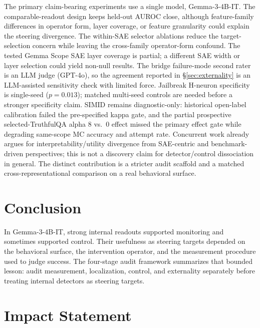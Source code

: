 \documentclass{article}
\begin{document}
The primary claim-bearing experiments use a single model, Gemma-3-4B-IT.
The comparable-readout design keeps held-out AUROC close, although feature-family differences in operator form, layer coverage, or feature granularity could explain the steering divergence.
The within-SAE selector ablations reduce the target-selection concern while leaving the cross-family operator-form confound.
The tested Gemma Scope SAE layer coverage \citep{lieberum2024gemmascope} is partial; a different SAE width or layer selection could yield non-null results.
The bridge failure-mode second rater is an LLM judge (GPT-4o), so the agreement reported in \S\ref{sec:externality} is an LLM-assisted sensitivity check with limited force.
Jailbreak H-neuron specificity is single-seed ($p = 0.013$); matched multi-seed controls are needed before a stronger specificity claim.
SIMID remains diagnostic-only: historical open-label calibration failed the pre-specified kappa gate, and the partial prospective selected-TruthfulQA alpha 8 vs.\ 0 effect missed the primary effect gate while degrading same-scope MC accuracy and attempt rate.
Concurrent work \citep{wang2026interpretability,arad2025saes,wu2025axbench} already argues for interpretability/utility divergence from SAE-centric and benchmark-driven perspectives; this is not a discovery claim for detector/control dissociation in general.
The distinct contribution is a stricter audit scaffold and a matched cross-representational comparison on a real behavioral surface.

\section{Conclusion}

In Gemma-3-4B-IT, strong internal readouts supported monitoring and sometimes supported control.
Their usefulness as steering targets depended on the behavioral surface, the intervention operator, and the measurement procedure used to judge success.
The four-stage audit framework summarizes that bounded lesson: audit measurement, localization, control, and externality separately before treating internal detectors as steering targets.

\section*{Impact Statement}
\end{document}
